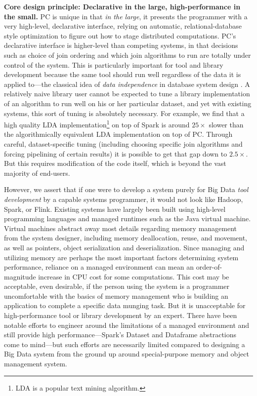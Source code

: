 \vspace{5 pt}
\noindent
\textbf{Core design principle: Declarative in the large, high-performance in the small.}
PC is unique in that \emph{in the large}, 
it presents the programmer with a very high-level,
declarative interface, relying on automatic, 
relational-database style optimization \cite{chaudhuri1998overview} to figure out how to stage
distributed computations.  
PC's declarative interface is higher-level than competing systems, in that decisions such as choice of join ordering and which
join algorithms to run are
totally under control of the system. 
This is particularly important for tool and library development because the same tool should run well regardless of the data
it is applied to---the classical idea of \emph{data independence} in database system design \cite{stonebraker1990third}.
A relatively naive library user cannot be expected to tune a library implementation of an algorithm to run
well on his or her particular dataset, and yet with existing systems, this sort of tuning
is absolutely necessary.  For example, we find
that a high quality LDA implementation\footnote{LDA \cite{blei2003latent} is a popular text mining algorithm.}
on top of Spark is around $25\times$ slower than the algorithmically equivalent LDA
implementation on top of PC.  Through careful, dataset-specific tuning (including choosing specific join algorithms and
forcing pipelining of certain results) it is possible to get that gap down to $2.5\times$.  But this requires modification of the
code itself, which is beyond the vast majority of end-users.

However, we assert that if one were to develop a system purely for Big Data \emph{tool development} 
by a capable systems programmer,
it would not look like Hadoop, Spark, or Flink.
Existing systems have largely been built using high-level programming languages and managed runtimes such as the Java 
virtual machine.  Virtual machines abstract away
most details regarding memory management
from the system designer, including memory deallocation, reuse, and movement, as well as pointers,
object serialization and deserialization.
Since managing and utilizing memory are perhaps the most important factors determining system performance, reliance
on a managed environment can mean an order-of-magnitude increase in CPU cost for some computations.  
This cost may be acceptable, even desirable, if the person using the system
is a programmer uncomfortable with the basics of memory management who is
building an application to complete a specific data munging task.  But it is unacceptable for high-performance tool
or library development by an expert.
There have been notable efforts to engineer around the limitations of a managed environment and still provide
high performance---Spark's Dataset and
Dataframe abstractions come to mind---but such efforts are necessarily limited compared to
designing a Big Data system from the ground up around special-purpose
memory and object management system.

